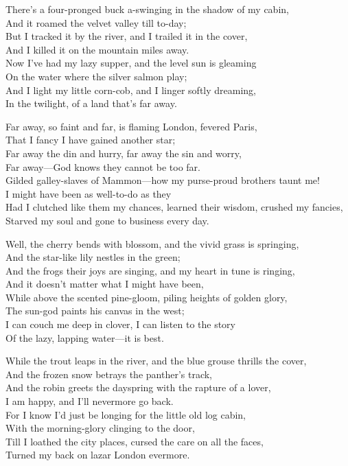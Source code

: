 
\begin{poemblock}
There's a four-pronged buck a-swinging in the shadow of my cabin,\\
\idt And it roamed the velvet valley till to-day;\\
But I tracked it by the river, and I trailed it in the cover,\\
\idt And I killed it on the mountain miles away.\\
Now I've had my lazy supper, and the level sun is gleaming\\
\idt On the water where the silver salmon play;\\
And I light my little corn-cob, and I linger softly dreaming,\\
\idt \idt In the twilight, of a land that's far away.

Far away, so faint and far, is flaming London, fevered Paris,\\
\idt That I fancy I have gained another star;\\
Far away the din and hurry, far away the sin and worry,\\
\idt Far away—God knows they cannot be too far.\\
Gilded galley-slaves of Mammon—how my purse-proud brothers taunt me!\\
\idt I might have been as well-to-do as they\\
Had I clutched like them my chances, learned their wisdom, crushed my fancies,\\
\idt Starved my soul and gone to business every day.

Well, the cherry bends with blossom, and the vivid grass is springing,\\
\idt And the star-like lily nestles in the green;\\
And the frogs their joys are singing, and my heart in tune is ringing,\\
\idt And it doesn't matter what I might have been,\\
While above the scented pine-gloom, piling heights of golden glory,\\
\idt The sun-god paints his canvas in the west;\\
I can couch me deep in clover, I can listen to the story\\
\idt Of the lazy, lapping water—it is best.

While the trout leaps in the river, and the blue grouse thrills the cover,\\
\idt And the frozen snow betrays the panther's track,\\
And the robin greets the dayspring with the rapture of a lover,\\
\idt I am happy, and I'll nevermore go back. \\
For I know I'd just be longing for the little old log cabin,\\
\idt With the morning-glory clinging to the door,\\
Till I loathed the city places, cursed the care on all the faces,\\
\idt Turned my back on lazar London evermore.


\end{poemblock}
